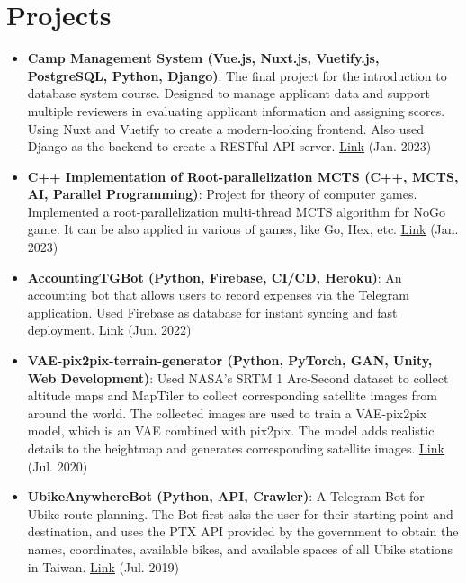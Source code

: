 \documentclass[a4paper,10pt]{extarticle}
\newcommand{\resumeItem}[2]{
  \item\small{
    \textbf{#1}{: #2 \vspace{-2pt}}
  }
}
\newcommand{\resumeSubItem}[2]{\resumeItem{#1}{#2}\vspace{-3pt}}
\newcommand{\resumeSubHeadingListStart}{\begin{itemize}[leftmargin=*]}
\newcommand{\resumeSubHeadingListEnd}{\end{itemize}}
\begin{document}
\section{Projects}
\resumeSubHeadingListStart
\setlength\itemsep{0.25em}
\resumeSubItem{Camp Management System (Vue.js, Nuxt.js, Vuetify.js, PostgreSQL, Python, Django)}{The final project for the introduction to database system course. Designed to manage applicant data and support multiple reviewers in evaluating applicant information and assigning scores. Using Nuxt and Vuetify to create a modern-looking frontend. Also used Django as the backend to create a RESTful API server. \href{https://github.com/jayin92/camp-management-system}{\underline{Link}} (Jan. 2023)}
\resumeSubItem{C++ Implementation of Root-parallelization MCTS (C++, MCTS, AI, Parallel Programming)}{Project for theory of computer games. Implemented a root-parallelization multi-thread MCTS algorithm for NoGo game. It can be also applied in various of games, like Go, Hex, etc. \href{https://github.com/jayin92/NYCU-theory-of-computer-games/tree/main/project3/code}{\underline{Link}} (Jan. 2023)}
\resumeSubItem{AccountingTGBot (Python, Firebase, CI/CD, Heroku)}{An accounting bot that allows users to record expenses via the Telegram application. Used Firebase as database for instant syncing and fast deployment.  \href{https://github.com/jayin92/AccountingTGBot}{\underline{Link}} (Jun. 2022)}
\vspace{2pt}
\resumeSubItem{VAE-pix2pix-terrain-generator (Python, PyTorch, GAN, Unity, Web Development)}{Used NASA's SRTM 1 Arc-Second dataset to collect altitude maps and MapTiler to collect corresponding satellite images from around the world. The collected images are used to train a VAE-pix2pix model, which is an VAE combined with pix2pix. The model adds realistic details to the heightmap and generates corresponding satellite images. 
 \href{https://github.com/jayin92/pix2pix-terrain-generator}{\underline{Link}} (Jul. 2020)}
\vspace{2pt}
\resumeSubItem{UbikeAnywhereBot (Python, API, Crawler)}{A Telegram Bot for Ubike route planning. The Bot first asks the user for their starting point and destination, and uses the PTX API provided by the government to obtain the names, coordinates, available bikes, and available spaces of all Ubike stations in Taiwan. 
 \href{https://github.com/jayin92/UBikeAnywhereBot}{\underline{Link}} (Jul. 2019)}
\resumeSubHeadingListEnd
\end{document}
